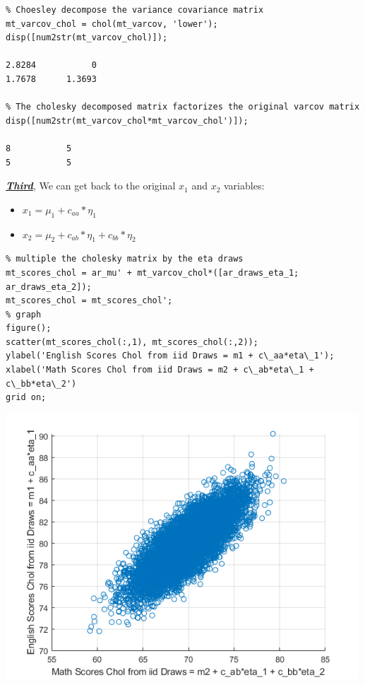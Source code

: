 \documentclass[
]{book}
\begin{document}
\begin{verbatim}
% Choesley decompose the variance covariance matrix
mt_varcov_chol = chol(mt_varcov, 'lower');
disp([num2str(mt_varcov_chol)]);

2.8284           0
1.7678      1.3693

% The cholesky decomposed matrix factorizes the original varcov matrix
disp([num2str(mt_varcov_chol*mt_varcov_chol')]);

8           5
5           5
\end{verbatim}

\underline{\textbf{\emph{Third}}}, We can get back to the original \(x_1\) and \(x_2\)
variables:

\begin{itemize}
\item
  \(\displaystyle x_1 =\mu_1 +c_{aa} *\eta_1\)
\item
  \(\displaystyle x_2 =\mu_2 +c_{ab} *\eta_1 +c_{bb} *\eta_2\)
\end{itemize}

\begin{verbatim}
% multiple the cholesky matrix by the eta draws
mt_scores_chol = ar_mu' + mt_varcov_chol*([ar_draws_eta_1; ar_draws_eta_2]);
mt_scores_chol = mt_scores_chol';
% graph
figure();
scatter(mt_scores_chol(:,1), mt_scores_chol(:,2));
ylabel('English Scores Chol from iid Draws = m1 + c\_aa*eta\_1');
xlabel('Math Scores Chol from iid Draws = m2 + c\_ab*eta\_1 + c\_bb*eta\_2')
grid on;
\end{verbatim}

\includegraphics[width=5.20833in,height=\textheight]{img/fs_cholesky_decomposition_images/figure_2.png}
\end{document}
